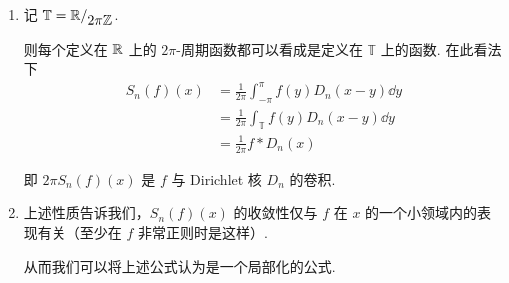 \begin{hint}
    \begin{enumerate}
        \item 记 $\mathbb{T}=\mathbb{R}/_{\displaystyle 2\pi\mathbb{Z}}$.
        
        则每个定义在 $\mathbb{R}$ 上的 $2\pi$-周期函数都可以看成是定义在 $\mathbb{T}$ 上的函数. 在此看法下
$$
\begin{aligned}
    S_n(f)(x)&=\frac{1}{2\pi}\int_{-\pi}^\pi f(y)D_n(x-y)\dd y\\
    &=\frac{1}{2\pi}\int_{\mathbb{T}}f(y)D_n(x-y)\dd y\\
    &=\frac{1}{2\pi}f*D_n(x)
\end{aligned}
$$

        即 $2\pi S_n(f)(x)$ 是 $f$ 与 Dirichlet 核 $D_n$ 的卷积.

        \item 上述性质告诉我们，$S_n(f)(x)$ 的收敛性仅与 $f$ 在 $x$ 的一个小领域内的表现有关（至少在 $f$ 非常正则时是这样）.
        
        从而我们可以将上述公式认为是一个局部化的公式.
    \end{enumerate}
\end{hint}